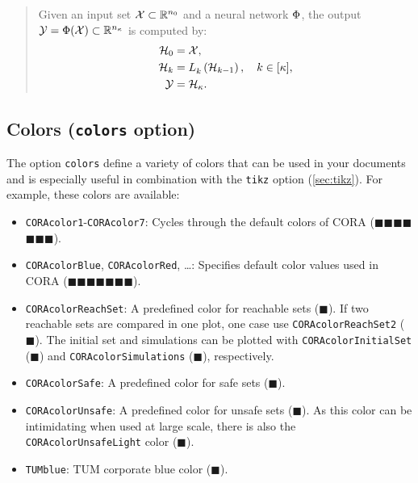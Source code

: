 \documentclass{article}
\newcommand{\showColor}[1]{{\color{#1}$\blacksquare$}}
\begin{document}
\begin{quote}
  Given an input set $\mathcal{X}\subset\mathbb{R}^{n_0}$ and a neural network $\Phi$,
  the output $\mathcal{Y}=\Phi(\mathcal{X})\subset\mathbb{R}^{n_{\kappa}}$ is computed by:
  \begin{align}
    \begin{split}
      \mathcal{H}_0 &= \mathcal{X}, \\
      \mathcal{H}_k &= L_{k}^\text{}\left(\mathcal{H}_{k-1}\right), \quad k\in[\kappa], \\
      \mathcal{Y} &= \mathcal{H}_{\kappa}.
    \end{split}
  \end{align}
\end{quote}

\subsection{Colors (\texttt{colors} option)} \label{sec:colors}
The option \texttt{colors} define a variety of colors that can be used in your documents
and is especially useful in combination with the \texttt{tikz} option (\cref{sec:tikz}).
For example, these colors are available:

\begin{itemize}
  \item \texttt{CORAcolor1}-\texttt{CORAcolor7}: Cycles through the default colors of CORA
        (\showColor{CORAcolor1}\showColor{CORAcolor2}\showColor{CORAcolor3}\showColor{CORAcolor4}\showColor{CORAcolor5}\showColor{CORAcolor6}\showColor{CORAcolor7}).
  \item \texttt{CORAcolorBlue}, \texttt{CORAcolorRed}, \ldots: Specifies default color values used in CORA
        (\showColor{CORAcolorBlue}\showColor{CORAcolorRed}\showColor{CORAcolorYellow}\showColor{CORAcolorPurple}\showColor{CORAcolorGreen}\showColor{CORAcolorLightBlue}\showColor{CORAcolorDarkRed}).
  \item \texttt{CORAcolorReachSet}: A predefined color for reachable sets (\showColor{CORAcolorReachSet}).
        If two reachable sets are compared in one plot, one case use \texttt{CORAcolorReachSet2} (\showColor{CORAcolorReachSet2}).
        The initial set and simulations can be plotted with \texttt{CORAcolorInitialSet} (\showColor{CORAcolorInitialSet}) and \texttt{CORAcolorSimulations} (\showColor{CORAcolorSimulations}), respectively.
  \item \texttt{CORAcolorSafe}: A predefined color for safe sets (\showColor{CORAcolorSafe}).
  \item \texttt{CORAcolorUnsafe}: A predefined color for unsafe sets (\showColor{CORAcolorUnsafe}).
        As this color can be intimidating when used at large scale, there is also the \texttt{CORAcolorUnsafeLight} color (\showColor{CORAcolorUnsafeLight}).

  \item \texttt{TUMblue}: TUM corporate blue color (\showColor{TUMblue}).
\end{itemize}
\end{document}
